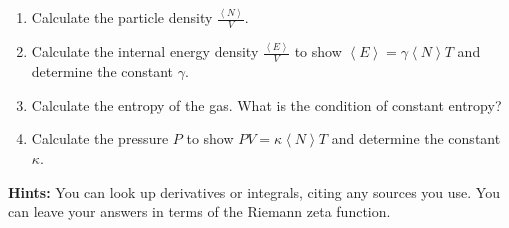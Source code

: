 \documentclass[12 pt]{article} %
\newcommand{\ga}{\ensuremath{\gamma} }
\newcommand{\ka}{\ensuremath{\kappa} }
\newcommand{\vev}[1]{\ensuremath{\left\langle #1 \right\rangle} }
\newcommand{\showmarks}[1]{\rightline{\texttt{[#1 marks]}}} %
\begin{document}
\begin{enumerate}[label={(\alph*)}]
  \item Calculate the particle density $\displaystyle \frac{\vev{N}}{V}$.

  \showmarks{6}

  \item Calculate the internal energy density $\displaystyle \frac{\vev{E}}{V}$ to show $\vev{E} = \ga \vev{N} T$ and determine the constant $\ga$.

  \showmarks{7}

  \item Calculate the entropy of the gas.
        What is the condition of constant entropy?

  \showmarks{6}

  \item Calculate the pressure $P$ to show $P V = \ka \vev{N} T$ and determine the constant $\ka$.

  \showmarks{7}
\end{enumerate}

\noindent\textbf{Hints:} You can look up derivatives or integrals, citing any sources you use.
You can leave your answers in terms of the Riemann zeta function.



\end{document}
